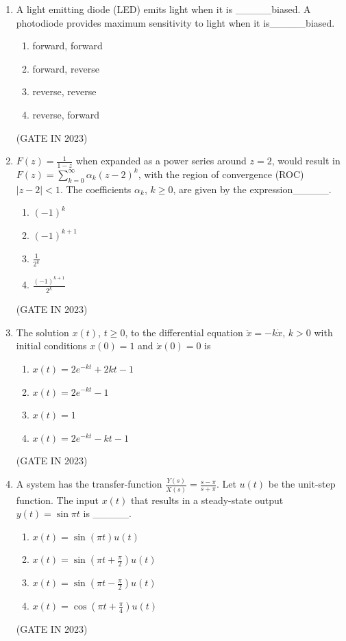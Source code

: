 \documentclass[journal]{IEEEtran}
\begin{document}
\begin{enumerate}
    \item A light emitting diode (LED) emits light when it is \_\_\_\_\_biased. A photodiode provides maximum sensitivity to light when it is\_\_\_\_\_biased.
    
    \begin{enumerate}
        \item forward, forward
        \item forward, reverse
        \item reverse, reverse
        \item reverse, forward
    \end{enumerate}
    \hfill(GATE IN 2023)

    \item $F(z) = \frac{1}{1-z}$ when expanded as a power series around $z = 2$, would result in $F(z) = \sum_{k=0}^{\infty} \alpha_k (z-2)^k$, with the region of convergence (ROC) $|z-2| < 1$. The coefficients $\alpha_k$, $k \geq 0$, are given by the expression\_\_\_\_\_.
    
    \begin{enumerate}
        \item $(-1)^k$
        \item $(-1)^{k+1}$
        \item $\frac{1}{2^k}$
        \item $\frac{(-1)^{k+1}}{2^k}$
    \end{enumerate}
    \hfill(GATE IN 2023)

    \item The solution $x(t)$, $t \geq 0$, to the differential equation $\ddot{x} = -k\dot{x}$, $k > 0$ with initial conditions $x(0) = 1$ and $\dot{x}(0) = 0$ is
    
    \begin{enumerate}
        \item $x(t) = 2e^{-kt} + 2kt - 1$
        \item $x(t) = 2e^{-kt} - 1$
        \item $x(t) = 1$
        \item $x(t) = 2e^{-kt} - kt - 1$
    \end{enumerate}
    \hfill(GATE IN 2023)

    \item A system has the transfer-function $\frac{Y(s)}{X(s)} = \frac{s-\pi}{s+\pi}$. Let $u(t)$ be the unit-step function. The input $x(t)$ that results in a steady-state output $y(t) = \sin \pi t$ is \_\_\_\_\_.
    
    \begin{enumerate}
        \item $x(t) = \sin(\pi t) u(t)$
        \item $x(t) = \sin\left(\pi t + \frac{\pi}{2}\right) u(t)$
        \item $x(t) = \sin\left(\pi t - \frac{\pi}{2}\right) u(t)$
        \item $x(t) = \cos\left(\pi t + \frac{\pi}{4}\right) u(t)$
    \end{enumerate}
    \hfill(GATE IN 2023)


\end{enumerate}
\end{document}
